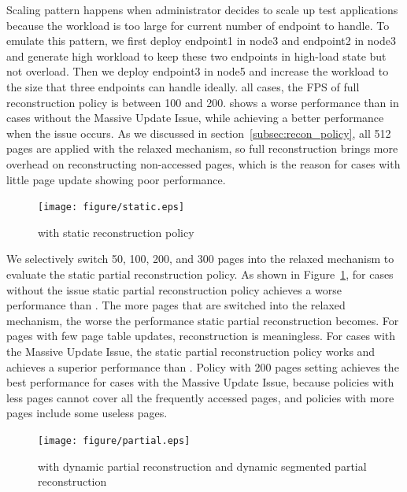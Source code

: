 Scaling pattern happens when administrator decides to scale up test applications because the workload is too large for current number of endpoint to handle.
To emulate this pattern, we first deploy endpoint1 in node3 and endpoint2 in node3 and generate high workload to keep these two endpoints in high-load state but not overload.
Then we deploy endpoint3 in node5 and increase the workload to the size that three endpoints can handle ideally. all cases, the FPS of full reconstruction policy is between 100 and 200.
\name{} shows a worse performance than \gvirt{} in cases without the Massive Update Issue, while achieving a better performance when the issue occurs.
As we discussed in section~\ref{subsec:recon_policy}, all 512 pages are applied with the relaxed mechanism, so full reconstruction brings more overhead
on reconstructing non-accessed pages, which is the reason for cases with little page update showing poor performance.

\begin{figure}[!htb]
  \centering
  \texttt{[image: figure/static.eps]}\\
  \caption{\name{} with static reconstruction policy}
  \label{fig:static}
\end{figure}

We selectively switch 50, 100, 200, and 300 pages into the relaxed mechanism to evaluate the static partial reconstruction policy.
As shown in Figure~\ref{fig:static}, for cases without the issue static partial reconstruction policy achieves a worse performance than \gvirt{}.
The more pages that are switched into the relaxed mechanism, the worse the performance static partial reconstruction becomes.
For pages with few page table updates, reconstruction is meaningless. For cases with the Massive Update Issue, the static partial reconstruction
policy works and achieves a superior performance than \gvirt{}. Policy with 200 pages setting achieves the best performance for cases with the
Massive Update Issue, because policies with less pages cannot cover all the frequently accessed pages,
and policies with more pages include some useless pages.


\begin{figure}[htbp]
  \centering
  \texttt{[image: figure/partial.eps]}\\
  \caption{\name{} with dynamic partial reconstruction and dynamic segmented partial reconstruction}
  \label{fig:partial}
\end{figure}

